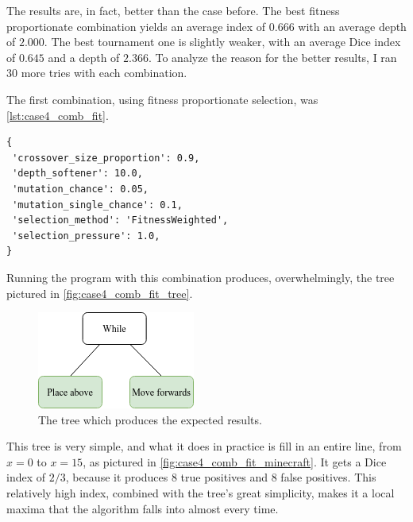 \documentclass{report}
\newenvironment{code}{\captionsetup{type=listing}}{}
\begin{document}
The results are, in fact, better than the case before. The best fitness proportionate combination yields an average index of $0.666$ with an average depth of $2.000$. The best tournament one is slightly weaker, with an average Dice index of $0.645$ and a depth of $2.366$. To analyze the reason for the better results, I ran 30 more tries with each combination.

The first combination, using fitness proportionate selection, was \autoref{lst:case4_comb_fit}.

\begin{code}
    \begin{verbatim}
{
 'crossover_size_proportion': 0.9,
 'depth_softener': 10.0,
 'mutation_chance': 0.05,
 'mutation_single_chance': 0.1,
 'selection_method': 'FitnessWeighted',
 'selection_pressure': 1.0,
}
    \end{verbatim}
    \caption{A set of parameters that lead to an average index of $0.666$ and an average depth of $2.000$.}
    \label{lst:case4_comb_fit}
\end{code}

Running the program with this combination produces, overwhelmingly, the tree pictured in \autoref{fig:case4_comb_fit_tree}.

\begin{figure}[H]
    \centering
    \includegraphics[scale=0.75]{case4_fit_tree}
    \caption{The tree which produces the expected results.}
    \label{fig:case4_comb_fit_tree}
\end{figure}

This tree is very simple, and what it does in practice is fill in an entire line, from $x = 0$ to $x = 15$, as pictured in \autoref{fig:case4_comb_fit_minecraft}. It gets a Dice index of $2/3$, because it produces $8$ true positives and $8$ false positives. This relatively high index, combined with the tree's great simplicity, makes it a local maxima that the algorithm falls into almost every time.
\end{document}
